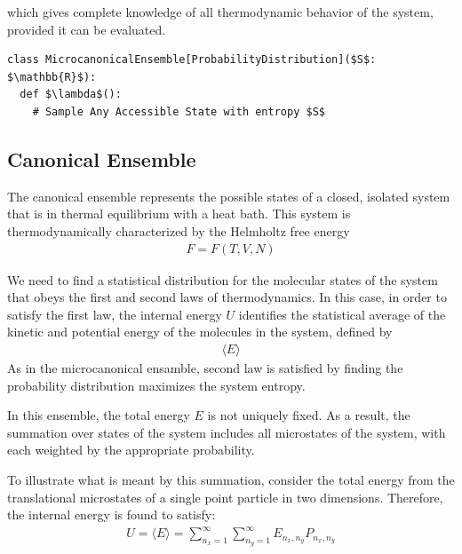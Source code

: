 \documentclass[book.tex]{subfiles}
\begin{document}
\noindent which gives complete knowledge of all thermodynamic behavior of the system, provided it can be evaluated.


\begin{lstlisting}
class MicrocanonicalEnsemble[ProbabilityDistribution]($S$: $\mathbb{R}$):
  def $\lambda$():
    # Sample Any Accessible State with entropy $S$
\end{lstlisting}

\subsection{Canonical Ensemble}

The canonical ensemble represents the possible states of a closed, isolated system that is in thermal equilibrium with a heat bath.
This system is thermodynamically characterized by the Helmholtz free energy 
\begin{align}
F = F(T,V,N)
\end{align}

We need to find a statistical distribution for the molecular states of the system that obeys the first and second laws of thermodynamics. In this case, in order to satisfy the first law, the internal energy $U$ identifies the statistical average of the kinetic and potential energy of the molecules in the system, defined by 
\begin{align}
\langle E\rangle
\end{align}
As in the microcanonical ensamble, second law is satisfied by finding the probability distribution maximizes the system entropy.


In this ensemble, the total energy $E$ is not uniquely fixed. As a result, the summation over states of the system includes all microstates of the system, with each weighted by the appropriate probability.

To illustrate what is meant by this summation, consider the total energy from the translational microstates of a single point particle in two dimensions. Therefore, the internal energy is found to satisfy:
\begin{align}
U = \langle E \rangle = \sum_{n_x=1}^\infty \sum_{n_y=1}^\infty E_{n_x,n_y} P_{n_x,n_y} 
\end{align}
\end{document}
